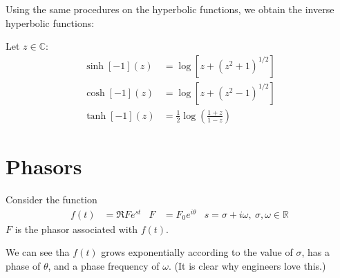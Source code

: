 \documentclass[12pt, english]{book}
\begin{document}
	Using the same procedures on the hyperbolic functions, we obtain the inverse hyperbolic functions:
	\begin{definition}
		\label{Inverse Hyperbolic Functions Definition - Complex}
		Let \(z \in \mathbb{C}\):
		\begin{align*}
			\sinh[-1](z) &= \log\left[z + (z^2 + 1)^{1/2}\right] \\
			\cosh[-1](z) &= \log\left[z + (z^2 - 1)^{1/2}\right] \\
			\tanh[-1](z) &= \frac{1}{2}\log\left(\frac{1+z}{1-z}\right)
		\end{align*}
	\end{definition} 



	\section{Phasors} \label{Phasors Section - Complex}
	
	\begin{definition}[Phasor]
		Consider the function 
		\begin{align*}
			f(t) &= \Re{Fe^{st}} & F &= F_0 e^{i\theta} & s = \sigma + i \omega, \ \sigma, \omega \in \mathbb{R}
		\end{align*}
		\(F\) is the phasor associated with \(f(t)\).
	\end{definition}
	We can see tha \(f(t)\) grows exponentially according to the value of \(\sigma\), has a phase of \(\theta\), and a phase frequency of \(\omega\). (It is clear why engineers love this.)
	
\end{document}
